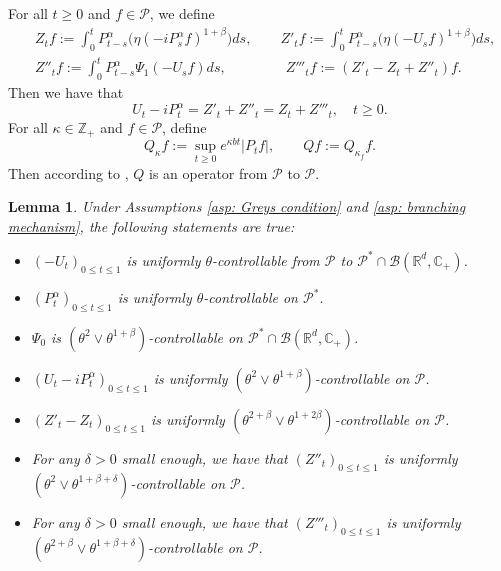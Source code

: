 \documentclass[12pt,a4paper]{amsart}
\theoremstyle{plain}
\newtheorem{lem}[thm]{Lemma}
\theoremstyle{definition}
\numberwithin{equation}{section}
\begin{document}
For all $t\geq 0$ and $f\in \mathcal P$, we define
\begin{align}
  \label{eq: def of Zf}
  & Z_t f
    := \int_0^t P^\alpha_{t-s}\big( \eta (-i P^\alpha_sf)^{1+\beta}\big)ds,
  \qquad Z'_t f
  := \int_0^t P^\alpha_{t-s}\big( \eta (-U_s f)^{1+\beta}\big)ds,\\
  &  Z''_t f
    := \int_0^t P^\alpha_{t-s}\Psi_1(-U_s f)ds,
  \qquad \qquad\  Z'''_t f
  := (Z'_t - Z_t+ Z''_t)f.
\end{align}
Then we have that
\begin{equation}
  \label{eq: key equality}
  U_t - i P^\alpha_t
  = Z'_t + Z''_t
  = Z_t + Z'''_t
  , \quad t\geq 0.
\end{equation}
For all $\kappa \in \mathbb Z_+$ and $f\in \mathcal P$, define
\begin{equation}
  \label{Q_k}
  Q_\kappa f
  := \sup_{t\geq 0} e^{\kappa b t}|P_t f|, \qquad  Q f:= Q_{\kappa_f}f.
\end{equation}
Then according to \cite[Fact 1.2]{MarksMilos2018CLT}, $Q$ is an operator from $\mathcal P$ to $\mathcal P$.

\begin{lem}
  \label{lem: upper bound for usgx}
  Under Assumptions \ref{asp: Greys condition} and \ref{asp: branching mechanism}, the following statements are true:
  \begin{itemize}
  \item[(1)]
    $(-U_t)_{0\leq t\leq 1}$ is uniformly $\theta$-controllable from $\mathcal P$ to $\mathcal P^*\cap \mathcal B(\mathbb R^d, \mathbb C_+)$.
  \item[(2)]
    $(P^\alpha_t)_{0\leq t\leq 1}$ is uniformly $\theta$-controllable on $\mathcal P^*$.
  \item[(3)]
    $\Psi_0$ is $(\theta^2\vee \theta^{1+\beta})$-controllable on $\mathcal P^* \cap \mathcal B(\mathbb R^d, \mathbb C_+)$.
  \item[(4)]
    $(U_t- iP_t^{\alpha})_{0\leq t\leq 1}$ is uniformly $(\theta^2\vee \theta^{1+\beta})$-controllable on $\mathcal P$.
  \item[(5)]
    $(Z'_t-Z_t)_{0\leq t\leq 1}$ is uniformly $(\theta^{2+\beta}\vee \theta^{1+2\beta})$-controllable on $\mathcal P$.
  \item[(6)]
    For any $\delta > 0$ small enough, we have that $(Z''_t)_{0\leq t\leq 1}$ is uniformly $(\theta^2\vee \theta^{1+\beta+\delta})$-controllable on $\mathcal P$.
  \item[(7)]
    For any $\delta > 0$ small enough, we have that $(Z'''_t)_{0\leq t\leq 1}$ is uniformly $(\theta^{2+\beta}\vee \theta^{1+\beta+\delta})$-controllable on $\mathcal P$.
  \end{itemize}
\end{lem}
\end{document}
